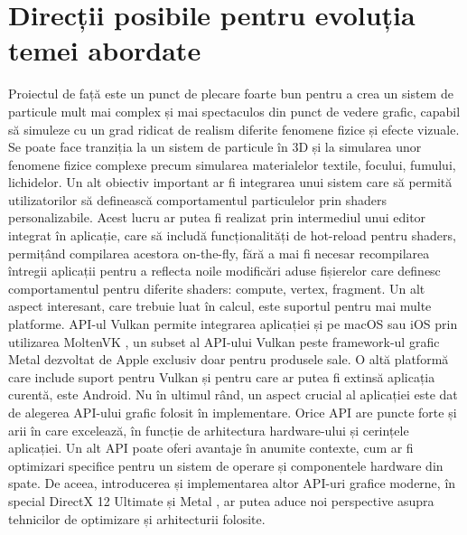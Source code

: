 \section{Direcții posibile pentru evoluția temei abordate}
Proiectul de față este un punct de plecare foarte bun pentru a crea un sistem de particule mult mai complex și mai spectaculos din punct de vedere grafic, capabil să simuleze cu un grad ridicat de realism diferite fenomene fizice și efecte vizuale. Se poate face tranziția la un sistem de particule în 3D și la simularea unor fenomene fizice complexe precum simularea materialelor textile, focului, fumului, lichidelor. Un alt obiectiv important ar fi integrarea unui sistem care să permită utilizatorilor să definească comportamentul particulelor prin shaders personalizabile. Acest lucru ar putea fi realizat prin intermediul unui editor integrat în aplicație, care să includă funcționalități de hot-reload pentru shaders, permițând compilarea acestora on-the-fly, fără a mai fi necesar recompilarea întregii aplicații pentru a reflecta noile modificări aduse fișierelor care definesc comportamentul pentru diferite shaders: compute, vertex, fragment. Un alt aspect interesant, care trebuie luat în calcul, este suportul pentru mai multe platforme. API-ul Vulkan permite integrarea aplicației și pe macOS sau iOS prin utilizarea MoltenVK \cite{MoltenVK_citation}, un subset al API-ului Vulkan peste framework-ul grafic Metal dezvoltat de Apple exclusiv doar pentru produsele sale. O altă platformă care include suport pentru Vulkan și pentru care ar putea fi extinsă aplicația curentă, este Android. Nu în ultimul rând, un aspect crucial al aplicației este dat de alegerea API-ului grafic folosit în implementare. Orice API are puncte forte și arii în care excelează, în funcție de arhitectura hardware-ului și cerințele aplicației. Un alt API poate oferi avantaje în anumite contexte, cum ar fi optimizari specifice pentru un sistem de operare și componentele hardware din spate. De aceea, introducerea și implementarea altor API-uri grafice moderne, în special DirectX 12 Ultimate \cite{DireX12Ultimate_citation} și Metal \cite{Metal_citation}, ar putea aduce noi perspective asupra tehnicilor de optimizare și arhitecturii folosite. 

\newpage
\vspace*{\fill}

